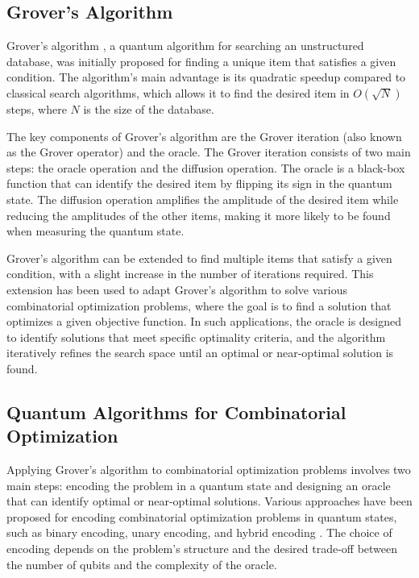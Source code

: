 \subsection{Grover's Algorithm}
\label{subsec:grover}
Grover's algorithm \cite{grover1996}, a quantum algorithm for searching an unstructured database, was initially proposed for finding a unique item that satisfies a given condition. The algorithm's main advantage is its quadratic speedup compared to classical search algorithms, which allows it to find the desired item in $O(\sqrt{N})$ steps, where $N$ is the size of the database.

The key components of Grover's algorithm are the Grover iteration (also known as the Grover operator) and the oracle. The Grover iteration consists of two main steps: the oracle operation and the diffusion operation. The oracle is a black-box function that can identify the desired item by flipping its sign in the quantum state. The diffusion operation amplifies the amplitude of the desired item while reducing the amplitudes of the other items, making it more likely to be found when measuring the quantum state.

Grover's algorithm can be extended to find multiple items that satisfy a given condition, with a slight increase in the number of iterations required. This extension has been used to adapt Grover's algorithm to solve various combinatorial optimization problems, where the goal is to find a solution that optimizes a given objective function. In such applications, the oracle is designed to identify solutions that meet specific optimality criteria, and the algorithm iteratively refines the search space until an optimal or near-optimal solution is found.

\subsection{Quantum Algorithms for Combinatorial Optimization}
\label{subsec:quantum_comb_opt}
Applying Grover's algorithm to combinatorial optimization problems involves two main steps: encoding the problem in a quantum state and designing an oracle that can identify optimal or near-optimal solutions. Various approaches have been proposed for encoding combinatorial optimization problems in quantum states, such as binary encoding, unary encoding, and hybrid encoding \cite{nielsen_chuang_2010}. The choice of encoding depends on the problem's structure and the desired trade-off between the number of qubits and the complexity of the oracle.

